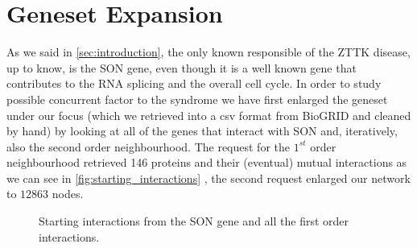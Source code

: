 \section{Geneset Expansion}\label{sec:geneset_expansion}
As we said in \autoref{sec:introduction}, the only known responsible of the ZTTK disease, up to know, is the SON gene, even though it is a well known gene that contributes to the RNA splicing and the overall cell cycle. In order to study possible concurrent factor to the syndrome we have first enlarged the geneset under our focus (which we retrieved into a csv format from BioGRID \cite{biogrid} and cleaned by hand) by looking at all of the genes that interact with SON and, iteratively, also the second order neighbourhood. The request for the $1^{st}$ order neighbourhood retrieved 146 proteins and their (eventual) mutual interactions as we can see in \autoref{fig:starting_interactions} , the second request enlarged our network to $12863$ nodes.
\begin{figure}[H]
    \centering
    \caption{Starting interactions from the SON gene and all the first order interactions.}
    \label{fig:starting_interactions}
\end{figure}
